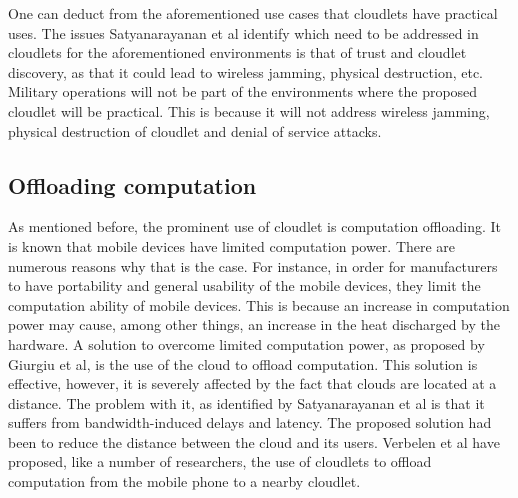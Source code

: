 \noindent One can deduct from the aforementioned use cases that cloudlets have practical uses. The issues Satyanarayanan et al\cite{RefWorks:107} identify which need to be addressed in cloudlets for the aforementioned environments is that of trust and cloudlet discovery, as that it could lead to wireless jamming, physical destruction, etc. Military operations will not be part of the environments where the proposed cloudlet will be practical. This is because it will not address wireless jamming, physical destruction of cloudlet and denial of service attacks.

\subsection{Offloading computation}

As mentioned before, the prominent use of cloudlet is computation offloading. It is known that mobile devices have limited computation power. There are numerous reasons why that is the case.
For instance, in order for manufacturers to have portability and general usability of the mobile devices, they limit the computation ability of mobile devices. This is because an increase in
computation power may cause, among other things, an increase in the heat discharged by the hardware. A solution to overcome limited computation power, as proposed by Giurgiu et al\cite{giurgiu2009calling},
is the use of the cloud to offload computation. This solution is effective, however, it is severely affected by the fact that clouds are located at a distance. The problem with it, as
identified by Satyanarayanan et al\cite{satyanarayanan2009case} is that it suffers from bandwidth-induced delays and latency. The proposed solution had been to reduce the distance between the cloud and its users. Verbelen et al\cite{RefWorks:93} have proposed, like a number of
researchers, the use of cloudlets to offload computation from the mobile phone to a nearby cloudlet.\newline

